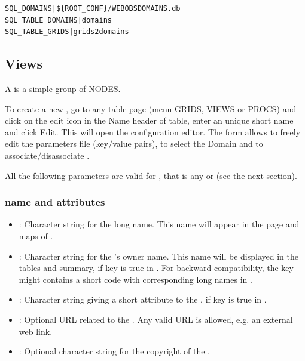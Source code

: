 \begin{lstlisting}[title=\wofile{WEBOBS.rc} (excerpt)]
SQL_DOMAINS|${ROOT_CONF}/WEBOBSDOMAINS.db
SQL_TABLE_DOMAINS|domains
SQL_TABLE_GRIDS|grids2domains
\end{lstlisting}



\subsection{Views}
\label{views}

A  is a simple group of NODES.

To create a new , go to any  table page (menu GRIDS, VIEWS or PROCS) and click on the edit icon in the Name header of table, enter an unique short name and click Edit. This will open the  configuration editor. The form allows to freely edit the parameters file (key/value pairs), to select the Domain and to associate/disassociate .



All the following parameters are valid for , that is any  or  (see the next section).

\subsubsection{ name and attributes}
\begin{itemize}

\item {}: Character string for the  long name. This name will appear in the  page and maps of .

\item {}: Character string for the 's owner name. This name will be displayed in the  tables and  summary, if  key is true in . For backward compatibility, the key might contains a short code with corresponding long names in .

%

\item {}: Character string giving a short attribute to the , if  key is true in .

\item {}: Optional URL related to the . Any valid URL is allowed, e.g. an external web link.

\item {}: Optional character string for the copyright of the .

\end{itemize}


